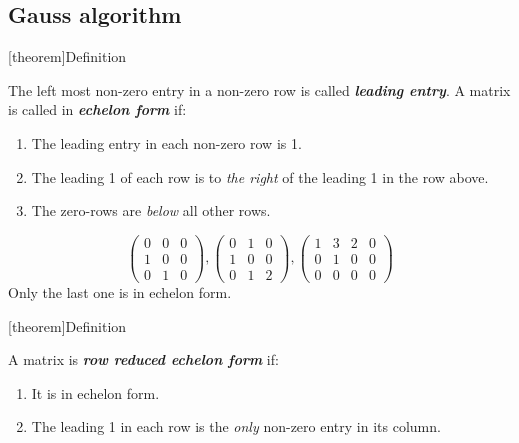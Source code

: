 \documentclass[12pt]{report}
\theoremstyle{definition}
\begin{document}
\subsection{Gauss algorithm}
[theorem]{Definition}
\begin{echelon form}
    The left most non-zero entry in a non-zero row is called \textbf{\emph{leading entry}}.
    A matrix is called in \textbf{\emph{echelon form}} if:
    \begin{enumerate}[label = (\arabic*)]
        \item The leading entry in each non-zero row is 1.
        \item The leading 1 of each row is to \emph{the right} of the leading 1 in the row above.
        \item The zero-rows are \emph{below} all other rows.
    \end{enumerate}
\end{echelon form}

\begin{ex}
    \[
        \begin{pmatrix}
            0 & 0 & 0 \\
            1 & 0 & 0 \\
            0 & 1 & 0
        \end{pmatrix}, \begin{pmatrix}
        0 & 1 & 0\\
        1 & 0 & 0\\
        0 & 1 & 2
        \end{pmatrix}, \begin{pmatrix}
        1 & 3 & 2 & 0\\
        0 & 1 & 0 & 0\\
        0 & 0 & 0 & 0
        \end{pmatrix} 
    \]
    Only the last one is in echelon form.
\end{ex}

[theorem]{Definition}
\begin{reduced echelon form}
    A matrix is \textbf{\emph{row reduced echelon form}} if:
    \begin{enumerate}[label = (\arabic*)]
        \item It is in echelon form.
        \item The leading 1 in each row is the \emph{only} non-zero entry in its column.
    \end{enumerate}
\end{reduced echelon form}
\end{document}
